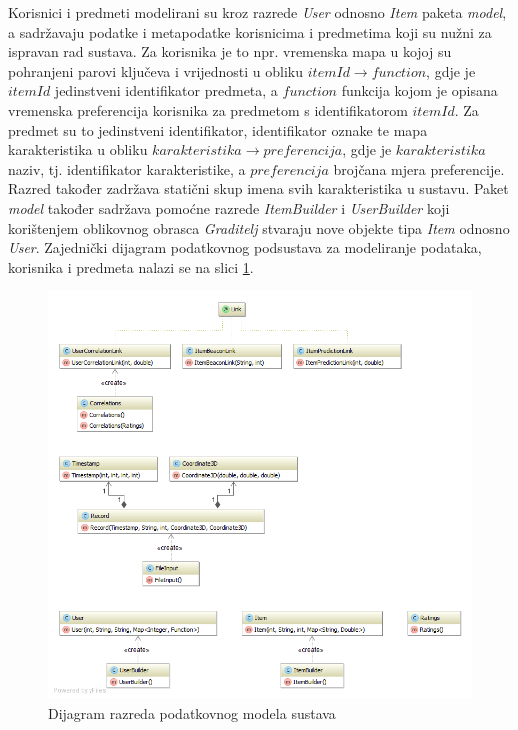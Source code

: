 \documentclass[times, utf8, diplomski, numeric]{fer}
\begin{document}
Korisnici i predmeti modelirani su kroz razrede \emph{User} odnosno \emph{Item}
paketa \emph{model}, a sadržavaju podatke i metapodatke korisnicima i predmetima
koji su nužni za ispravan rad sustava. Za korisnika je to npr. vremenska mapa u
kojoj su pohranjeni parovi ključeva i vrijednosti u obliku
$itemId \rightarrow function$, gdje je $itemId$ jedinstveni identifikator
predmeta, a $function$ funkcija kojom je opisana vremenska preferencija
korisnika za predmetom s identifikatorom $itemId$. Za predmet su to jedinstveni
identifikator, identifikator oznake te mapa karakteristika u obliku
$karakteristika \rightarrow preferencija$, gdje je $karakteristika$ naziv, tj.
identifikator karakteristike, a $preferencija$ brojčana mjera preferencije.
Razred također zadržava statični skup imena svih karakteristika u sustavu.
Paket \emph{model} također sadržava pomoćne razrede \emph{ItemBuilder} i
\emph{UserBuilder} koji korištenjem oblikovnog obrasca \emph{Graditelj} stvaraju
nove objekte tipa \emph{Item} odnosno \emph{User}. Zajednički dijagram
podatkovnog podsustava za modeliranje podataka, korisnika i predmeta nalazi se
na slici \ref{fig:diagramdata}.

\begin{figure}[H]
	\centering
	\includegraphics[width=14cm]{images/diagrams/diagramdata.png}
	\caption{Dijagram razreda podatkovnog modela sustava}
	\label{fig:diagramdata}
\end{figure}
 
\end{document}
